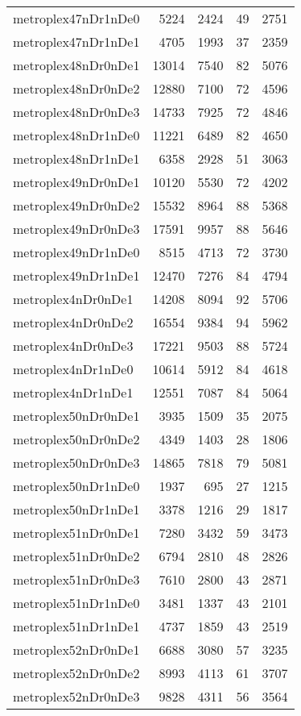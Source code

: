 \begin{longtable}{lrrrr}
metroplex47nDr1nDe0 & 5224 & 2424 & 49 & 2751 \\
metroplex47nDr1nDe1 & 4705 & 1993 & 37 & 2359 \\
metroplex48nDr0nDe1 & 13014 & 7540 & 82 & 5076 \\
metroplex48nDr0nDe2 & 12880 & 7100 & 72 & 4596 \\
metroplex48nDr0nDe3 & 14733 & 7925 & 72 & 4846 \\
metroplex48nDr1nDe0 & 11221 & 6489 & 82 & 4650 \\
metroplex48nDr1nDe1 & 6358 & 2928 & 51 & 3063 \\
metroplex49nDr0nDe1 & 10120 & 5530 & 72 & 4202 \\
metroplex49nDr0nDe2 & 15532 & 8964 & 88 & 5368 \\
metroplex49nDr0nDe3 & 17591 & 9957 & 88 & 5646 \\
metroplex49nDr1nDe0 & 8515 & 4713 & 72 & 3730 \\
metroplex49nDr1nDe1 & 12470 & 7276 & 84 & 4794 \\
metroplex4nDr0nDe1 & 14208 & 8094 & 92 & 5706 \\
metroplex4nDr0nDe2 & 16554 & 9384 & 94 & 5962 \\
metroplex4nDr0nDe3 & 17221 & 9503 & 88 & 5724 \\
metroplex4nDr1nDe0 & 10614 & 5912 & 84 & 4618 \\
metroplex4nDr1nDe1 & 12551 & 7087 & 84 & 5064 \\
metroplex50nDr0nDe1 & 3935 & 1509 & 35 & 2075 \\
metroplex50nDr0nDe2 & 4349 & 1403 & 28 & 1806 \\
metroplex50nDr0nDe3 & 14865 & 7818 & 79 & 5081 \\
metroplex50nDr1nDe0 & 1937 & 695 & 27 & 1215 \\
metroplex50nDr1nDe1 & 3378 & 1216 & 29 & 1817 \\
metroplex51nDr0nDe1 & 7280 & 3432 & 59 & 3473 \\
metroplex51nDr0nDe2 & 6794 & 2810 & 48 & 2826 \\
metroplex51nDr0nDe3 & 7610 & 2800 & 43 & 2871 \\
metroplex51nDr1nDe0 & 3481 & 1337 & 43 & 2101 \\
metroplex51nDr1nDe1 & 4737 & 1859 & 43 & 2519 \\
metroplex52nDr0nDe1 & 6688 & 3080 & 57 & 3235 \\
metroplex52nDr0nDe2 & 8993 & 4113 & 61 & 3707 \\
metroplex52nDr0nDe3 & 9828 & 4311 & 56 & 3564 \\

\end{longtable}
